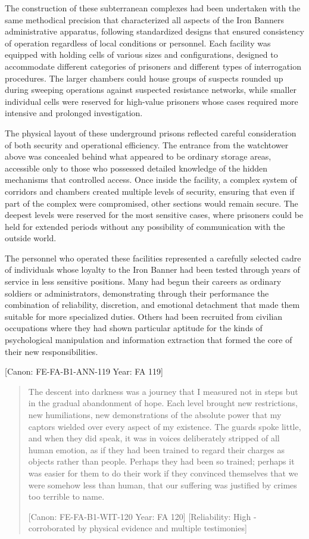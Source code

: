 The construction of these subterranean complexes had been undertaken
with the same methodical precision that characterized all aspects of the
Iron Banner\textquotesingle s administrative apparatus, following
standardized designs that ensured consistency of operation regardless of
local conditions or personnel. Each facility was equipped with holding
cells of various sizes and configurations, designed to accommodate
different categories of prisoners and different types of interrogation
procedures. The larger chambers could house groups of suspects rounded
up during sweeping operations against suspected resistance networks,
while smaller individual cells were reserved for high-value prisoners
whose cases required more intensive and prolonged investigation.

The physical layout of these underground prisons reflected careful
consideration of both security and operational efficiency. The entrance
from the watchtower above was concealed behind what appeared to be
ordinary storage areas, accessible only to those who possessed detailed
knowledge of the hidden mechanisms that controlled access. Once inside
the facility, a complex system of corridors and chambers created
multiple levels of security, ensuring that even if part of the complex
were compromised, other sections would remain secure. The deepest levels
were reserved for the most sensitive cases, where prisoners could be
held for extended periods without any possibility of communication with
the outside world.

The personnel who operated these facilities represented a carefully
selected cadre of individuals whose loyalty to the Iron Banner had been
tested through years of service in less sensitive positions. Many had
begun their careers as ordinary soldiers or administrators,
demonstrating through their performance the combination of reliability,
discretion, and emotional detachment that made them suitable for more
specialized duties. Others had been recruited from civilian occupations
where they had shown particular aptitude for the kinds of psychological
manipulation and information extraction that formed the core of their
new responsibilities.

{[}Canon: FE-FA-B1-ANN-119 \textbar{} Year: FA 119{]}

\begin{quote}
The descent into darkness was a journey that I measured not in steps but
in the gradual abandonment of hope. Each level brought new restrictions,
new humiliations, new demonstrations of the absolute power that my
captors wielded over every aspect of my existence. The guards spoke
little, and when they did speak, it was in voices deliberately stripped
of all human emotion, as if they had been trained to regard their
charges as objects rather than people. Perhaps they had been so trained;
perhaps it was easier for them to do their work if they convinced
themselves that we were somehow less than human, that our suffering was
justified by crimes too terrible to name.

{[}Canon: FE-FA-B1-WIT-120 \textbar{} Year: FA 120{]} {[}Reliability:
High - corroborated by physical evidence and multiple testimonies{]}
\end{quote}

